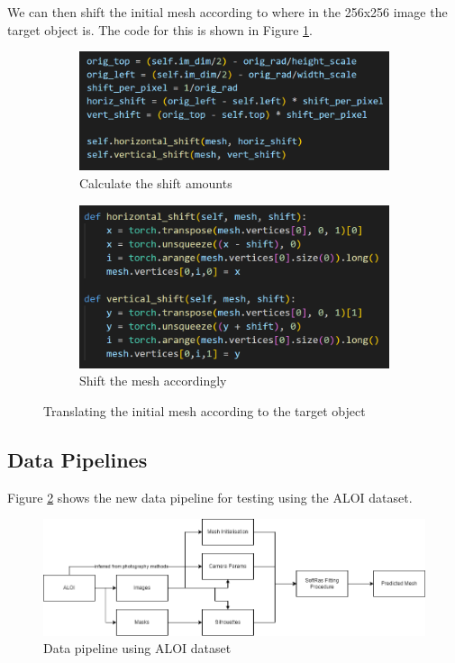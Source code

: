 \documentclass{article}
\begin{document}
We can then shift the initial mesh according to where in the 256x256 image the target object is. The code for this is shown in Figure \ref{shiftcode}.

\begin{figure}[h!]
  \centering
  \begin{subfigure}{0.4\textwidth}
    \centering
    \includegraphics[width=\textwidth]{images/shift_a.png}
    \caption{Calculate the shift amounts}
  \end{subfigure}
  \hfill
  \begin{subfigure}{0.4\textwidth}
    \centering
    \includegraphics[width=\textwidth]{images/shift_b.png}
    \caption{Shift the mesh accordingly}
  \end{subfigure}
  \caption{Translating the initial mesh according to the target object}
  \label{shiftcode}
\end{figure}

\subsection{Data Pipelines}

Figure \ref {aloidatapipe} shows the new data pipeline for testing using the ALOI dataset.

\begin{figure}[h!]
  \centering
  \includegraphics[width=\textwidth]{images/aloidatapipe.png}
  \caption{Data pipeline using ALOI dataset}
  \label{aloidatapipe}
\end{figure}
\end{document}
